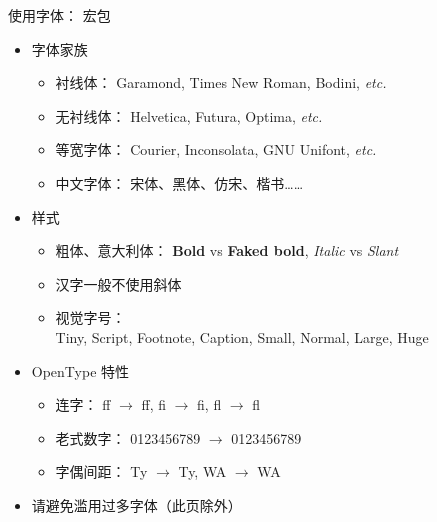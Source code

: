 \begin{frame}{使用字体： 宏包}
\begin{itemize}
  \item<1-> 字体家族 

    \begin{itemize}
      \item 衬线体：
        {\Garamond Garamond}, {\Times Times New Roman}, {\Bodini Bodini}, \textit{etc.}
      \item 无衬线体：
        {\Helvetica Helvetica}, {\Futura Futura}, {\Optima Optima}, \textit{etc.}
      \item 等宽字体：
        {\Courier Courier}, {\Inconsolata Inconsolata}, {\Unifont GNU Unifont}, \textit{etc.}
      \item 中文字体：
        宋体、{\heiti 黑体}、{\fangsong 仿宋}、{\kaishu 楷书}……
    \end{itemize}

  \item<2-> 样式 

    \begin{itemize}
      \item 粗体、意大利体：
        \textbf{Bold} vs {\textbf{Faked bold}},
        \textit{Italic} vs {\textsl{Slant}}
      \item<3-> \alert{汉字一般不使用斜体}
      \item<4-> 视觉字号：\\
        {\LatinRomanV    Tiny},
        {\LatinRomanVI   Script},
        {\LatinRomanVII  Footnote},
        {\LatinRomanVIII Caption},
        {\LatinRomanIX   Small},
        {\LatinRomanX    Normal},
        {\LatinRomanXII  Large},
        {\LatinRomanXVII Huge}
    \end{itemize}

  \item<5-> OpenType 特性

    \begin{itemize}
      \item 连字：
        f{}f $\to$ ff, f{}i $\to$ fi, f{}l $\to$ fl
      \item 老式数字：
        0123456789 $\to$ {0123456789}
      \item 字偶间距：
        T{}y $\to$ Ty, W{}A $\to$ WA
    \end{itemize}

  \item<6-> \alert{请避免滥用过多字体{\tiny （此页除外）}}
\end{itemize}
\vspace{-0.2cm}
\end{frame}
